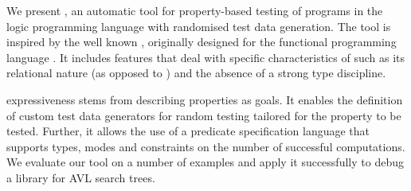 

We present \plqc{}, an automatic tool for property-based
testing of programs in the logic programming language \Prolog{} with
randomised test data generation.
%
The tool is inspired by the well known \QuickCheck, originally designed
for the functional programming language \Haskell{}. It includes features
that deal with specific characteristics of \Prolog{} such as its
relational nature (as opposed to \Haskell{}) and the absence of a strong
type discipline.


\plqc{} expressiveness stems from describing properties as
\Prolog{} goals.
%
It enables the definition of custom test data generators for
random testing tailored for the property to be tested.
%
Further, it allows the use of a predicate specification language that
supports types, modes and constraints on the number of successful
computations.
%
We evaluate our tool on a number of  examples and apply
it successfully to debug a \Prolog{} library for AVL search trees.

